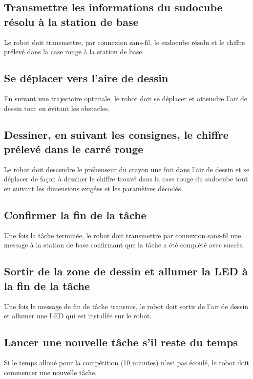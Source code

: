 \subsection{Transmettre les informations du sudocube résolu à la station de base}
Le robot doit transmettre, par connexion sans-fil, le sudocube résolu et le chiffre prélevé dans la case rouge à la station de base.
\subsection{Se déplacer vers l'aire de dessin}
En suivant une trajectoire optimale, le robot doit se déplacer et atteindre l'air de dessin tout en évitant les obstacles.
\subsection{Dessiner, en suivant les consignes, le chiffre prélevé dans le carré rouge}
Le robot doit descendre le préhenseur du crayon une foit dans l'air de dessin et se déplacer de façon à dessiner le chiffre trouvé dans la case rouge du sudocube tout en suivant les dimensions exigées et les paramètres décodés.
\subsection{Confirmer la fin de la tâche}
Une fois la tâche terminée, le robot doit transmettre par connexion sans-fil une message à la station de base confirmant que la tâche a été complété avec succès.
\subsection{Sortir de la zone de dessin et allumer la LED à la fin de la tâche}
Une fois le message de fin de tâche transmis, le robot doit sortir de l'air de dessin et allumer une LED qui est installée sur le robot.
\subsection{Lancer une nouvelle tâche s'il reste du temps}
Si le temps alloué pour la compétition (10 minutes) n'est pas écoulé, le robot doit commencer une nouvelle tâche.